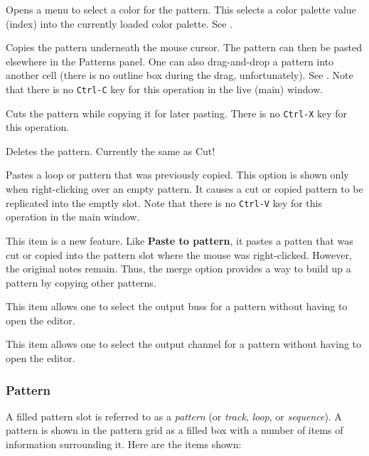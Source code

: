    Opens a menu to select a color for the pattern.  This selects a color
   palette value (index) into the currently loaded color palette.
   See .

   Copies the pattern underneath the mouse cursor.
   The pattern can then be pasted elsewhere in the Patterns panel.
   One can also drag-and-drop a pattern into another cell (there is no outline
   box during the drag, unfortunately).
   See .
   Note that there is no \texttt{Ctrl-C} key for this operation in the
   live (main) window.

   Cuts the pattern while copying it for later pasting.
   There is no \texttt{Ctrl-X} key for this operation.

   Deletes the pattern.  Currently the same as Cut!

   Pastes a loop or pattern that was previously copied.
   This option is shown only when right-clicking over an empty pattern.
   It causes a cut or copied pattern to be replicated into the emptly slot.
   Note that there is no \texttt{Ctrl-V} key for this operation in the
   main window.

   This item is a new feature.  Like \textbf{Paste to pattern}, it pastes a
   patten that was cut or copied into the pattern slot where the mouse was
   right-clicked.  However, the original notes remain.  Thus, the merge
   option provides a way to build up a pattern by copying other patterns.

   This item allows one to select the output buss for a pattern without having
   to open the editor.

   This item allows one to select the output channel for a pattern without
   having to open the editor.
   
\subsubsection{Pattern}
\label{subsubsec:patterns_pattern_filled}

   A filled pattern slot is referred to as a \textsl{pattern}
   (or \textsl{track}, \textsl{loop}, or \textsl{sequence}).
   A pattern is shown in the pattern grid as a filled box with a number of
   items of information surrounding it.  Here are the items shown:

